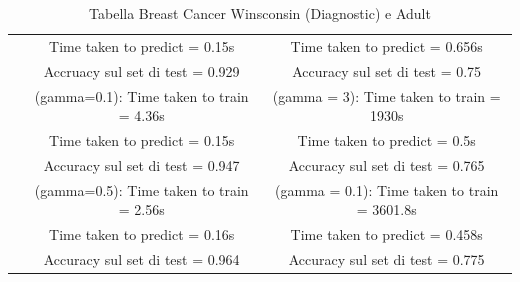 \documentclass{article}
\begin{document}
\begin{table}[htbp]
\begin{tabular}{|c|c|c|}
	  & Time taken to predict = 0.15s & Time taken to predict = 0.656s\\
	  & Accruacy sul set di test = 0.929 & Accuracy sul set di test = 0.75\\
	  & (gamma=0.1): Time taken to train = 4.36s & (gamma = 3): Time taken to train = 1930s\\
	  & Time taken to predict = 0.15s & Time taken to predict = 0.5s\\
	  & Accuracy sul set di test = 0.947 & Accuracy sul set di test = 0.765\\
	  & (gamma=0.5): Time taken to train = 2.56s & (gamma = 0.1): Time taken to train = 3601.8s\\
	  & Time taken to predict = 0.16s & Time taken to predict = 0.458s\\
	  & Accuracy sul set di test = 0.964 & Accuracy sul set di test = 0.775\\
	  \hline
	\end{tabular}
	\caption{Tabella Breast Cancer Winsconsin (Diagnostic) e Adult}
  \end{table}
\end{document}
